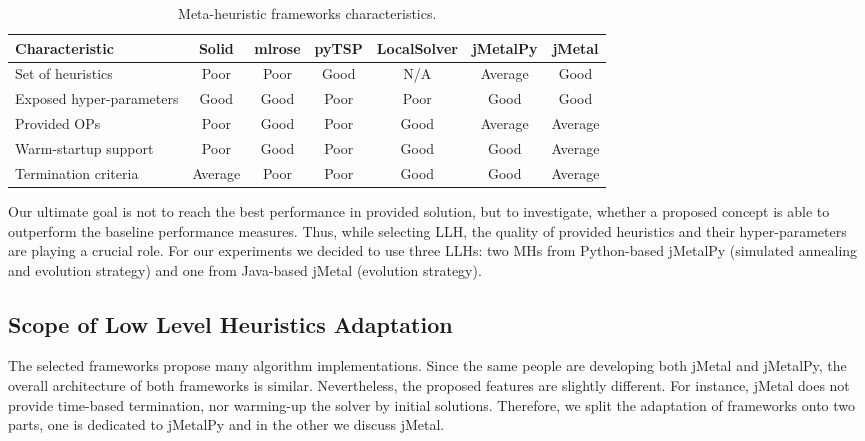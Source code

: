 \begin{table}[h!]
	\centering
	\begin{tabular}{l|cccccc}
		\hline
		\rowcolor{gray!10}
		\textbf{Characteristic} & \textbf{Solid} & \textbf{mlrose} & \textbf{pyTSP} & \textbf{LocalSolver} & \textbf{jMetalPy} & \textbf{jMetal} \\
		\hline
		Set of heuristics & \cellcolor{red!25}Poor & \cellcolor{red!25}Poor & \cellcolor{green!25}Good & N/A & \cellcolor{yellow!25}Average & \cellcolor{green!25}Good \\
		
		Exposed hyper-parameters & \cellcolor{green!25}Good & \cellcolor{green!25}Good & \cellcolor{red!25}Poor & \cellcolor{red!25}Poor & \cellcolor{green!25}Good & \cellcolor{green!25}Good \\
		
		Provided OPs & \cellcolor{red!25}Poor & \cellcolor{green!25}Good & \cellcolor{red!25}Poor & \cellcolor{green!25}Good & \cellcolor{yellow!25}Average & \cellcolor{yellow!25}Average \\
		
		Warm-startup support & \cellcolor{red!25}Poor & \cellcolor{green!25}Good & \cellcolor{red!25}Poor & \cellcolor{green!25}Good & \cellcolor{green!25}Good & \cellcolor{yellow!25}Average \\
		
		Termination criteria & \cellcolor{yellow!25}Average & \cellcolor{red!25}Poor & \cellcolor{red!25}Poor & \cellcolor{green!25}Good & \cellcolor{green!25}Good & \cellcolor{yellow!25}Average \\
		\hline
	\end{tabular}
	\caption{Meta-heuristic frameworks characteristics.}
	\label{iml: table llh selection}
\end{table}

Our ultimate goal is not to reach the best performance in provided solution, but to investigate, whether a proposed concept is able to outperform the baseline performance measures. Thus, while selecting LLH, the quality of provided heuristics and their hyper-parameters are playing a crucial role. For our experiments we decided to use three LLHs: two MHs from Python-based jMetalPy (simulated annealing and evolution strategy) and one from Java-based jMetal (evolution strategy).


\subsection{Scope of Low Level Heuristics Adaptation}\label{impl: LLH scope}
The selected frameworks propose many algorithm implementations. Since the same people are developing both jMetal and jMetalPy, the overall architecture of both frameworks is similar. Nevertheless, the proposed features are slightly different. For instance, jMetal does not provide time-based termination, nor warming-up the solver by initial solutions. Therefore, we split the adaptation  of frameworks onto two parts, one is dedicated to jMetalPy and in the other we discuss jMetal.

